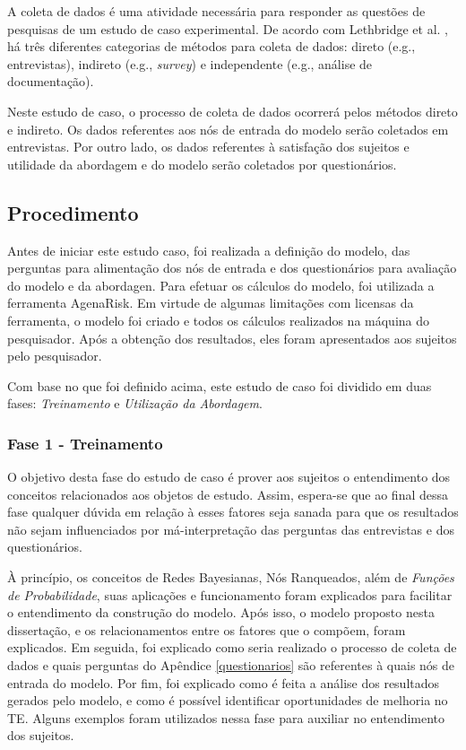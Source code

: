 A coleta de dados é uma atividade necessária para responder as questões de pesquisas de um estudo de caso experimental. De acordo com Lethbridge et al. \cite{lethbridge}, há três diferentes categorias de métodos para coleta de dados: direto (e.g., entrevistas), indireto (e.g., \textit{survey}) e independente (e.g., análise de documentação).

Neste estudo de caso, o processo de coleta de dados ocorrerá pelos métodos direto e indireto. Os dados referentes aos nós de entrada do modelo serão coletados em entrevistas. Por outro lado, os dados referentes à satisfação dos sujeitos e utilidade da abordagem e do modelo serão coletados por questionários.

\subsection{Procedimento}
\label{estudodecaso:design:procedimento}

Antes de iniciar este estudo caso, foi realizada a definição do modelo, das perguntas para alimentação dos nós de entrada e dos questionários para avaliação do modelo e da abordagen. Para efetuar os cálculos do modelo, foi utilizada a ferramenta AgenaRisk. Em virtude de algumas limitações com licensas da ferramenta, o modelo foi criado e todos os cálculos realizados na máquina do pesquisador. Após a obtenção dos resultados, eles foram apresentados aos sujeitos pelo pesquisador.

Com base no que foi definido acima, este estudo de caso foi dividido em duas fases: \textit{Treinamento} e \textit{Utilização da Abordagem}.

\subsubsection{Fase 1 - Treinamento}
\label{estudodecaso:design:procedimento:treinamento}

O objetivo desta fase do estudo de caso é prover aos sujeitos o entendimento dos conceitos relacionados aos objetos de estudo. Assim, espera-se que ao final dessa fase qualquer dúvida em relação à esses fatores seja sanada para que os resultados não sejam influenciados por má-interpretação das perguntas das entrevistas e dos questionários.

À princípio, os conceitos de Redes Bayesianas, Nós Ranqueados, além de \textit{Funções de Probabilidade}, suas aplicações e funcionamento foram explicados para facilitar o entendimento da construção do modelo. Após isso, o modelo proposto nesta dissertação, e os relacionamentos entre os fatores que o compõem, foram explicados. Em seguida, foi explicado como seria realizado o processo de coleta de dados e quais perguntas do Apêndice \ref{questionarios} são referentes à quais nós de entrada do modelo. Por fim, foi explicado como é feita a análise dos resultados gerados pelo modelo, e como é possível identificar oportunidades de melhoria no TE. Alguns exemplos foram utilizados nessa fase para auxiliar no entendimento dos sujeitos.

